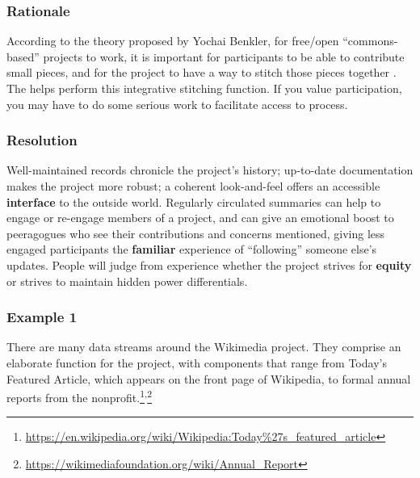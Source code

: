 \subsubsection*{Rationale}
According to the theory proposed by Yochai Benkler, for free/open ``commons-based'' projects to work, it is important for participants to be able to contribute small pieces, and for the project to have a way to stitch those pieces together \cite{coases-penguin}. The  helps perform this integrative stitching function. If you value participation, you may have to do some serious work to facilitate access to process.

\subsubsection*{Resolution} 
Well-maintained records chronicle the project's history; up-to-date documentation makes the project more robust; a coherent look-and-feel offers an accessible \textbf{interface} to the outside world. Regularly circulated summaries can help to engage or re-engage members of a project, and can give an emotional boost to peeragogues who see their contributions and concerns mentioned, giving less engaged participants the \textbf{familiar} experience of ``following'' someone else's updates. People will judge from experience whether the project strives for \textbf{equity} or strives to maintain hidden power differentials.  

\subsubsection*{Example 1} 
There are many data streams around the Wikimedia project.  They comprise an elaborate  function for the project, with components that range from Today's Featured Article, which appears on the front page of Wikipedia, to formal annual reports from the nonprofit.\footnote{\url{https://en.wikipedia.org/wiki/Wikipedia:Today\%27s_featured_article}}\textsuperscript{,}\footnote{\url{https://wikimediafoundation.org/wiki/Annual_Report}}



